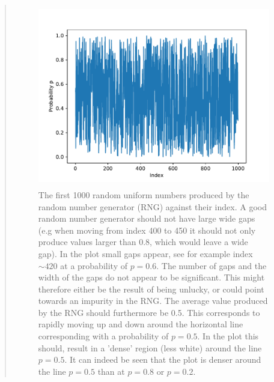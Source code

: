 \begin{quote}
\begin{figure}[!hb]
\centering
\includegraphics[width=12cm, height=8.0cm]{./Plots/1_plot_index.pdf}
\caption{The first 1000 random uniform numbers produced by the random number generator (RNG) against their index. A good random number generator should not have large wide gaps  (e.g when moving from index 400 to 450 it should not only produce values larger than 0.8, which would leave a wide gap). In the plot small gaps appear, see for example index $\sim 420$ at a probability of $ p = 0.6$. The number of gaps and the width of the gaps do not appear to be significant. This might therefore either be the result of being unlucky, or could point towards an impurity in the RNG.   The average value produced by the RNG should furthermore be 0.5. This corresponds to rapidly moving up and down around the horizontal line corresponding with a probability of $ p = 0.5$. In the plot this should, result in a 'dense' region (less white) around the line $p = 0.5$. It can indeed be seen that the plot is denser around the line $p = 0.5$ than at $ p = 0.8$ or $p = 0.2$. }
\end{figure}


\end{quote}
